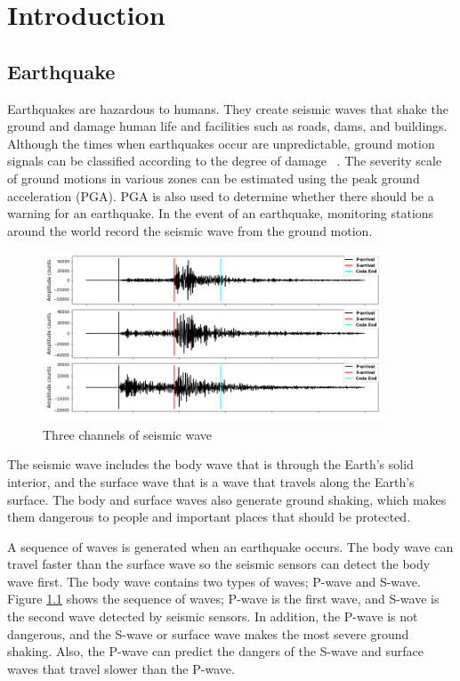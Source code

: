 \chapter{Introduction}\label{Chap:Intro}
\section{Earthquake}
Earthquakes are hazardous to humans. They create seismic waves that shake the ground and damage human life and facilities such as roads, dams, and buildings. Although the times when earthquakes occur are unpredictable, ground motion signals can be classified according to the degree of damage ~\cite{allen2019earthquake}. The severity scale of ground motions in various zones can be estimated using the peak ground acceleration (PGA). PGA is also used to determine whether there should be a warning for an earthquake. In the event of an earthquake, monitoring stations around the world record the seismic wave from the ground motion.  



\begin{figure}[ht]
    \centering
    \includegraphics[width=0.9\textwidth]{img/3ch.png}
    \caption{Three channels of seismic wave}
    \label{fig:3-wave}
\end{figure}

The seismic wave includes the body wave that is through the Earth's solid interior, and the surface wave that is a wave that travels along the Earth's surface. The body and surface waves also generate ground shaking, which makes them dangerous to people and important places that should be protected.

A sequence of waves is generated when an earthquake occurs. The body wave can travel faster than the surface wave so the seismic sensors can detect the body wave first. The body wave contains two types of waves; P-wave and S-wave. Figure \ref{fig:3-wave} shows the sequence of waves; P-wave is the first wave, and S-wave is the second wave detected by seismic sensors. In addition, the P-wave is not dangerous, and the S-wave or surface wave makes the most severe ground shaking. Also, the P-wave can predict the dangers of the S-wave and surface waves that travel slower than the P-wave.

